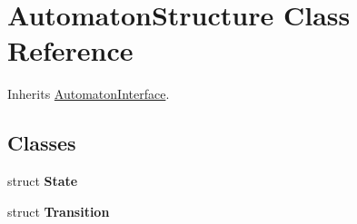 \hypertarget{class_automaton_structure}{\section{Automaton\-Structure Class Reference}
\label{class_automaton_structure}
}


Inherits \hyperlink{class_automaton_interface}{Automaton\-Interface}.

\subsection*{Classes}
\begin{DoxyCompactItemize}
\item 
struct {\bfseries State}
\item 
struct {\bfseries Transition}
\end{DoxyCompactItemize}

